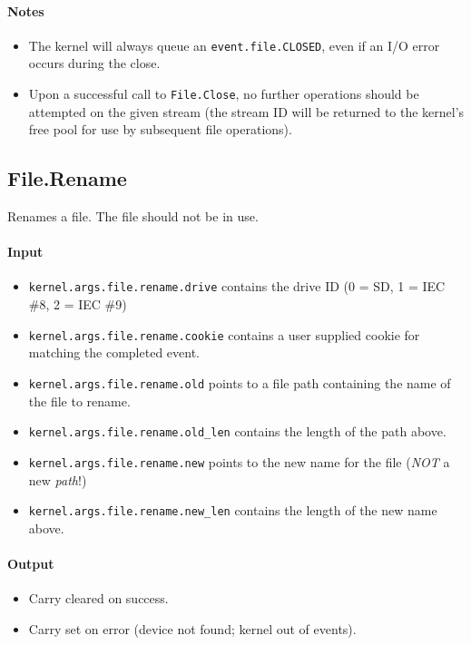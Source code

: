 \paragraph{Notes}

\begin{itemize}
\item The kernel will always queue an \verb+event.file.CLOSED+, even if an I/O error occurs during the close.
\item Upon a successful call to \verb+File.Close+, no further operations should be attempted on the given stream (the stream ID will be returned to the kernel's free pool for use by subsequent file operations).
\end{itemize}

\subsection*{File.Rename}
Renames a file.  The file should not be in use.

\paragraph{Input}

\begin{itemize}
\item \verb+kernel.args.file.rename.drive+ contains the drive ID (0 = SD, 1 = IEC \#8, 2 = IEC \#9)
\item \verb+kernel.args.file.rename.cookie+ contains a user supplied cookie for matching the completed event.
\item \verb+kernel.args.file.rename.old+ points to a file path containing the name of the file to rename.
\item \verb+kernel.args.file.rename.old_len+ contains the length of the path above.
\item \verb+kernel.args.file.rename.new+ points to the new name for the file ({\em NOT} a new {\em path}!)
\item \verb+kernel.args.file.rename.new_len+ contains the length of the new name above.
\end{itemize}

\paragraph{Output}

\begin{itemize}
\item Carry cleared on success.
\item Carry set on error (device not found; kernel out of events).
\end{itemize}

